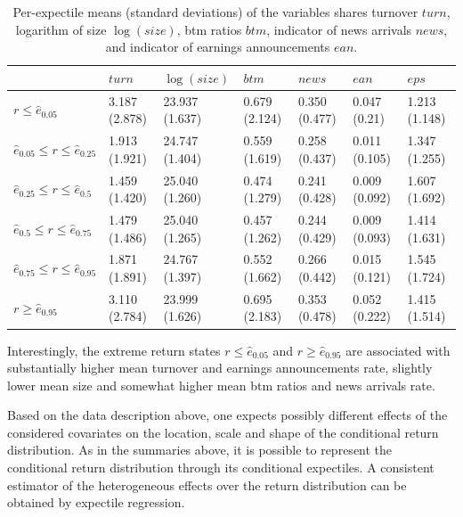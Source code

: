 \documentclass[]{article}
\begin{document}
\vspace{-0.5cm}
\begin{table}[h!]

\caption{\label{tab:table05}Per-expectile means (standard deviations) of the variables shares turnover $turn$, logarithm of size $\log(size)$, btm ratios $btm$, indicator of news arrivals $news$, and indicator of earnings announcements $ean$.}
\centering
\begin{tabular}[t]{l|l|l|l|l|l|l}
\hline
  & $turn$ & $\log(size)$ & $btm$ & $news$ & $ean$&$eps$\\
\hline
{\scriptsize{$r\leq \hat e_{ 0.05 }$}} & 3.187 (2.878) & 23.937 (1.637) & 0.679 (2.124) & 0.350 (0.477) & 0.047 (0.21)& 1.213 (1.148)\\
\hline
{\scriptsize{$\hat e_{ 0.05 }\leq r\leq \hat e_{ 0.25 }$}} & 1.913 (1.921) & 24.747 (1.404) & 0.559 (1.619) & 0.258 (0.437) & 0.011 (0.105)& 1.347 (1.255)\\
\hline
{\scriptsize{$\hat e_{ 0.25}\leq r\leq \hat e_{ 0.5 }$}} & 1.459 (1.420) & 25.040 (1.260) & 0.474 (1.279) & 0.241 (0.428) & 0.009 (0.092)& 1.607 (1.692)\\
\hline
{\scriptsize{$\hat e_{ 0.5 }\leq r\leq \hat e_{ 0.75 }$ }}& 1.479 (1.486) & 25.040 (1.265) & 0.457 (1.262) & 0.244 (0.429) & 0.009 (0.093)& 1.414 (1.631)\\
\hline
{\scriptsize{$\hat e_{ 0.75 }\leq r\leq \hat e_{ 0.95 }$}} & 1.871 (1.891) & 24.767 (1.397) & 0.552 (1.662) & 0.266 (0.442) & 0.015 (0.121)& 1.545 (1.724)\\
\hline
{\scriptsize{$r\geq \hat e_{ 0.95 }$}} & 3.110 (2.784) & 23.999 (1.626) & 0.695 (2.183) & 0.353 (0.478) & 0.052 (0.222)& 1.415 (1.514)\\
\hline
\end{tabular}
\end{table}

Interestingly, the extreme return states \(r\leq \hat e_{0.05}\) and \(r\geq \hat e_{0.95}\) are associated with substantially higher mean turnover and earnings announcements rate, slightly lower mean size and somewhat higher mean btm ratios and news arrivals rate.


Based on the data description above, one expects possibly different effects of the considered covariates on the location, scale and shape of the conditional return distribution. As in the summaries above, it is possible to represent the conditional return distribution through its conditional expectiles. A consistent estimator of the heterogeneous effects over the return distribution can be obtained by expectile regression.

\newpage


\end{document}
